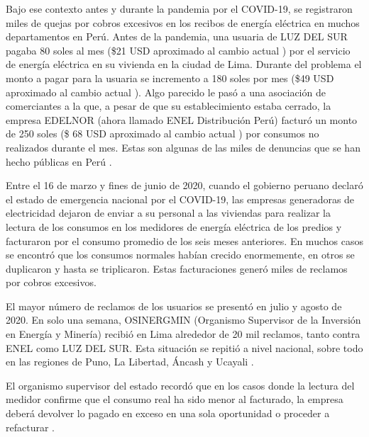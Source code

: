Bajo ese contexto antes y durante la pandemia por el COVID-19, se registraron miles de quejas por cobros excesivos en los recibos de energía eléctrica en muchos departamentos en Perú. Antes de la pandemia, una usuaria de LUZ DEL SUR \citep{WEBSITE:32} pagaba 80 soles al mes (\$21 USD aproximado al cambio actual \citep{WEBSITE:43}) por el servicio de energía eléctrica en su vivienda en la ciudad de Lima. Durante del problema el monto a pagar para la usuaria se incremento a 180 soles por mes (\$49 USD aproximado al cambio actual \citep{WEBSITE:43}). Algo parecido le pasó a una asociación de comerciantes a la que, a pesar de que su establecimiento estaba cerrado, la empresa EDELNOR (ahora llamado ENEL Distribución Perú) \citep{WEBSITE:33} \citep{WEBSITE:34} facturó un monto de 250 soles (\$ 68 USD aproximado al cambio actual \citep{WEBSITE:43}) por consumos no realizados durante el mes. Estas son algunas de las miles de denuncias que se han hecho públicas en Perú \citep{WEBSITE:1}.

Entre el 16 de marzo y fines de junio de 2020, cuando el gobierno peruano declaró el estado de emergencia nacional por el COVID-19, las empresas generadoras de electricidad dejaron de enviar a su personal a las viviendas para realizar la lectura de los consumos en los medidores de energía eléctrica de los predios y facturaron por el consumo promedio de los seis meses anteriores. En muchos casos se encontró que los consumos normales habían crecido enormemente, en otros se duplicaron y hasta se triplicaron. Estas facturaciones generó miles de reclamos por cobros excesivos. %

El mayor número de reclamos de los usuarios se presentó en julio y agosto de 2020. En solo una semana, OSINERGMIN (Organismo Supervisor de la Inversión en Energía y Minería) recibió en Lima alrededor de 20 mil reclamos, tanto contra ENEL como LUZ DEL SUR. Esta situación se repitió a nivel nacional, sobre todo en las regiones de Puno, La Libertad, Áncash y Ucayali \citep{WEBSITE:1}.


El organismo supervisor del estado recordó que en los casos donde la lectura del medidor confirme que el consumo real ha sido menor al facturado, la empresa deberá devolver lo pagado en exceso en una sola oportunidad o proceder a refacturar \citep{WEBSITE:2}.

